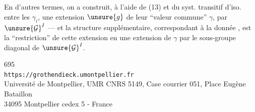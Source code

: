 En d'autres termes, on a construit, à l'aide de (13) et du syst. transitif d'iso. entre les $\gamma_i$, une extension $\unsure{g}$ de leur ``valeur commune'' $\gamma$, par $\unsure{\mathcal G}^I$ --- et la structure supplémentaire, correspondant à la donnée , est la ``restriction'' de cette extension en une extension de $\gamma$ par le sous-groupe diagonal de $\unsure{\mathcal G}^I$.


\begin{center}
695\\
\texttt{https://grothendieck.umontpellier.fr}\\
Université de Montpellier, UMR CNRS 5149, Case courrier 051, Place Eugène Bataillon\\
34095 Montpellier cedex 5 - France
\end{center}
